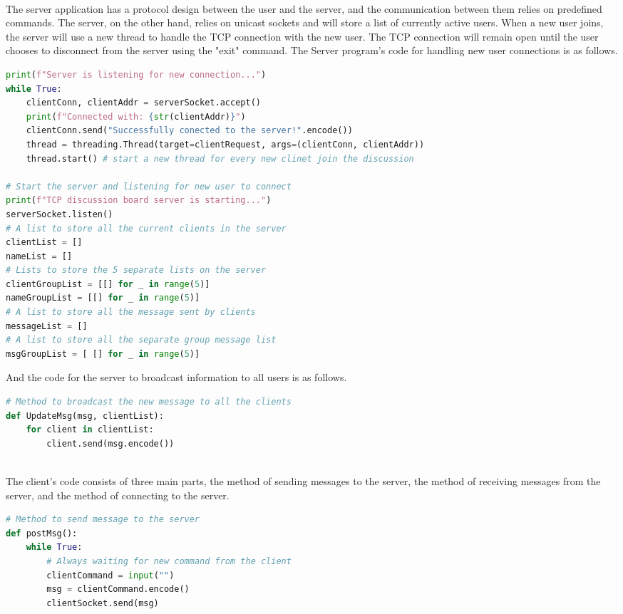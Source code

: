 \documentclass[12pt, border = 4pt, multi]{article} %
\begin{document}
\begin{multicols}{2}
\\
The server application has a protocol design between the user and the server, and the communication between them relies on predefined commands. The server, on the other hand, relies on unicast sockets and will store a list of currently active users. When a new user joins, the server will use a new thread to handle the TCP connection with the new user. The TCP connection will remain open until the user chooses to disconnect from the server using the "exit" command. The Server program's code for handling new user connections is as follows.
\begin{lstlisting}[language = python]
print(f"Server is listening for new connection...")
while True:
    clientConn, clientAddr = serverSocket.accept()
    print(f"Connected with: {str(clientAddr)}")
    clientConn.send("Successfully conected to the server!".encode())
    thread = threading.Thread(target=clientRequest, args=(clientConn, clientAddr))
    thread.start() # start a new thread for every new clinet join the discussion
    
# Start the server and listening for new user to connect
print(f"TCP discussion board server is starting...")
serverSocket.listen()
# A list to store all the current clients in the server
clientList = []
nameList = []
# Lists to store the 5 separate lists on the server
clientGroupList = [[] for _ in range(5)]
nameGroupList = [[] for _ in range(5)]
# A list to store all the message sent by clients
messageList = []
# A list to store all the separate group message list
msgGroupList = [ [] for _ in range(5)]
\end{lstlisting}
And the code for the server to broadcast information to all users is as follows.
\begin{lstlisting}[language = python]
# Method to broadcast the new message to all the clients
def UpdateMsg(msg, clientList):
    for client in clientList:
        client.send(msg.encode())
\end{lstlisting}
\\
The client's code consists of three main parts, the method of sending messages to the server, the method of receiving messages from the server, and the method of connecting to the server.
\begin{lstlisting}[language = python]
# Method to send message to the server
def postMsg():
    while True:
        # Always waiting for new command from the client
        clientCommand = input("")
        msg = clientCommand.encode()
        clientSocket.send(msg)
    

\end{lstlisting}
\end{multicols}
\end{document}
